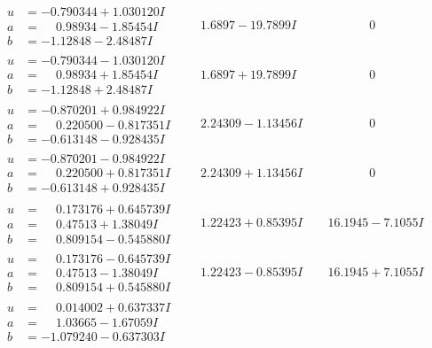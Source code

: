\documentclass[1p]{elsarticle_modified}
\theoremstyle{definition}
\begin{document}
$$\begin{array}{c|c|c}
\begin{aligned}
u &= -0.790344 + 1.030120 I \\
a &= \phantom{-}0.98934 - 1.85454 I \\
b &= -1.12848 - 2.48487 I\end{aligned}
 & \phantom{-}1.6897 - 19.7899 I & \phantom{-0.000000 } 0 \\ \hline\begin{aligned}
u &= -0.790344 - 1.030120 I \\
a &= \phantom{-}0.98934 + 1.85454 I \\
b &= -1.12848 + 2.48487 I\end{aligned}
 & \phantom{-}1.6897 + 19.7899 I & \phantom{-0.000000 } 0 \\ \hline\begin{aligned}
u &= -0.870201 + 0.984922 I \\
a &= \phantom{-}0.220500 - 0.817351 I \\
b &= -0.613148 - 0.928435 I\end{aligned}
 & \phantom{-}2.24309 - 1.13456 I & \phantom{-0.000000 } 0 \\ \hline\begin{aligned}
u &= -0.870201 - 0.984922 I \\
a &= \phantom{-}0.220500 + 0.817351 I \\
b &= -0.613148 + 0.928435 I\end{aligned}
 & \phantom{-}2.24309 + 1.13456 I & \phantom{-0.000000 } 0 \\ \hline\begin{aligned}
u &= \phantom{-}0.173176 + 0.645739 I \\
a &= \phantom{-}0.47513 + 1.38049 I \\
b &= \phantom{-}0.809154 - 0.545880 I\end{aligned}
 & \phantom{-}1.22423 + 0.85395 I & \phantom{-}16.1945 - 7.1055 I \\ \hline\begin{aligned}
u &= \phantom{-}0.173176 - 0.645739 I \\
a &= \phantom{-}0.47513 - 1.38049 I \\
b &= \phantom{-}0.809154 + 0.545880 I\end{aligned}
 & \phantom{-}1.22423 - 0.85395 I & \phantom{-}16.1945 + 7.1055 I \\ \hline\begin{aligned}
u &= \phantom{-}0.014002 + 0.637337 I \\
a &= \phantom{-}1.03665 - 1.67059 I \\
b &= -1.079240 - 0.637303 I\end{aligned}

\end{array}$$
\end{document}
